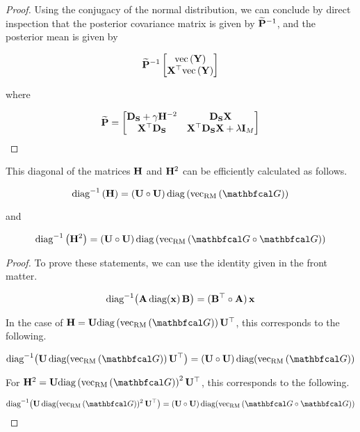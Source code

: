 \begin{proof}
    Using the conjugacy of the normal distribution, we can conclude by direct inspection that the posterior covariance matrix is given by $\widetilde{\mathbf{P}}^{-1}$, and the posterior mean is given by 

    $$
    \widetilde{\mathbf{P}}^{-1} \begin{bmatrix} \text{\textup{vec}}\left(\mathbf{Y}\right) \\ \mathbf{X}^\top \text{\textup{vec}}\left(\mathbf{Y}\right) \end{bmatrix}
    $$

    where 

    $$
    \widetilde{\mathbf{P}} = \begin{bmatrix}
        \mathbf{D}_{\mathbf{S}} + \gamma \mathbf{H}^{-2} & \mathbf{D}_{\mathbf{S}}  \mathbf{X} \\
        \mathbf{X}^\top \mathbf{D}_{\mathbf{S}} & \mathbf{X}^\top \mathbf{D}_{\mathbf{S}} \mathbf{X} + \lambda \mathbf{I}_M   
       \end{bmatrix}
    $$

\end{proof}


\begin{theorem}
    \label{the:efficient_H_diag}

    This diagonal of the matrices $\mathbf{H}$ and $\mathbf{H}^2$ can be efficiently calculated as follows. 

    \begin{equation}
        \diagi{\HH} = (\U \circ \U) \, \diag{\vecrm{\Gt}}
    \end{equation}
    
    and 

    \begin{equation}
        \diagi{\HH^2} = (\U \circ \U) \, \diag{\vecrm{\Gt \circ \Gt}}
    \end{equation}

\end{theorem}

\begin{proof}

    To prove these statements, we can use the identity given in the front matter. 

    \begin{equation}
        \text{diag}^{-1} \big( \mathbf{A}\, \text{diag}(\mathbf{x}) \,\mathbf{B} \big) = (\mathbf{B}^{\top} \circ \mathbf{A}) \, \mathbf{x}
    \end{equation}

    In the case of $\HH = \U \diag{\vecrm{\Gt}} \U^\top$, this corresponds to the following. 

    \begin{equation}
        \text{diag}^{-1} \big( \U \, \text{diag}(\vecrm{\Gt}) \,\U^\top \big) = (\U \circ \U) \, \text{diag}(\vecrm{\Gt})
    \end{equation}

    For $\HH^2 = \U \diag{\vecrm{\Gt}}^2 \U^\top$, this corresponds to the following. 

    \begin{equation}
        \text{diag}^{-1} \big( \U \, \text{diag}(\vecrm{\Gt})^2 \,\U^\top \big) = (\U \circ \U) \, \text{diag}(\vecrm{\Gt \circ \Gt})
    \end{equation}
    
\end{proof}


